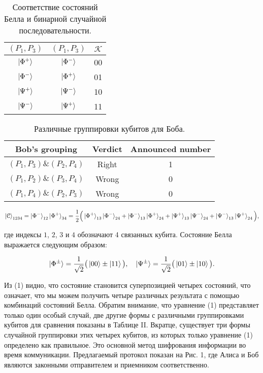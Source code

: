 \documentclass[a4paper,11pt]{article}
\begin{document}
\begin{table}
	\centering
	\caption{\label{tab:1}Соответствие состояний Белла и бинарной случайной последовательности.}
	\begin{tabular}{ |c||c||c| }
		\hline
		$(P_1, P_3)$ & $(P_1, P_3)$ & $\mathcal{K}$ \\ \hline
		$\ket{\Phi^+}$ & $\ket{\Phi^-}$ & 00 \\ 
		$\ket{\Phi^-}$ & $\ket{\Phi^+}$ & 01 \\ 
		$\ket{\Psi^+}$ & $\ket{\Psi^-}$ & 10 \\ 
		$\ket{\Psi^-}$ & $\ket{\Psi^+}$ & 11 \\ 
		\hline
	\end{tabular}
\end{table}

\begin{table}
	\centering
	\caption{\label{tab:2}Различные группировки кубитов для Боба.}
	\begin{tabular}{ |c||c||c| }
		\hline
		Bob's grouping & Verdict & Announced number \\ \hline
		$(P_1, P_3)\&(P_2, P_4)$ & Right & 1 \\
		$(P_1, P_2)\&(P_3, P_4)$ & Wrong & 0 \\
		$(P_1, P_4)\&(P_2, P_3)$ & Wrong & 0 \\
		\hline
	\end{tabular}
	
\end{table}



\begin{equation*}
\ket{\mathcal{C}}_{1234} = \ket{\Phi^-}_{12} \ket{\Phi^+}_{34}
= \dfrac{1}{2} \Big(\ket{\Phi^+}_{13} \ket{\Phi^-}_{24} + 
 					\ket{\Phi^-}_{13} \ket{\Phi^+}_{24} +
 					\ket{\Psi^+}_{13} \ket{\Psi^-}_{24} +
 					\ket{\Psi^-}_{13} \ket{\Psi^+}_{24} \Big),
\end{equation*}

где индексы $1$, $2$, $3$ и $4$ обозначают 4 связанных кубита. Состояние Белла выражается следующим образом:

\begin{equation*}
\ket{\Phi^{\pm}} = \dfrac{1}{\sqrt2}\big(\ket{00} \pm \ket{11} \big), \quad
\ket{\Psi^{\pm}} = \dfrac{1}{\sqrt2}\big(\ket{01} \pm \ket{10} \big).
\end{equation*}


Из (1) видно, что состояние становится суперпозицией четырех состояний, что означает, что мы можем получить четыре различных результата с помощью комбинаций состояний Белла. Обратим внимание, что уравнение (1) представляет только один особый случай, две другие формы с различными группировками кубитов для сравнения показаны в Таблице II. Вкратце, существует три формы случайной группировки этих четырех кубитов, из которых только уравнение (1) определено как правильное. Это основной метод шифрования информации во время коммуникации. Предлагаемый протокол показан на Рис. 1, где Алиса и Боб являются законными отправителем и приемником соответственно.
\end{document}
